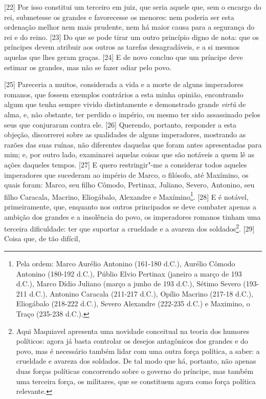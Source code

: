{[}22{]} Por isso constitui um
terceiro em juiz, que seria aquele que, sem o encargo do rei, submetesse
os grandes e favorecesse os menores: nem poderia ser esta ordenação
melhor nem mais prudente, nem há maior causa para a segurança do rei e
do reino. {[}23{]} Do que se pode tirar um outro princípio digno de
nota: que os príncipes devem atribuir aos outros as tarefas
desagradáveis, e a si mesmos aquelas que lhes geram graças. {[}24{]} E
de novo concluo que um príncipe deve estimar os grandes, mas não se
fazer odiar pelo povo.

{[}25{]} Pareceria a muitos, considerada a vida e a morte de alguns
imperadores romanos, que fossem exemplos contrários a esta minha
opinião, encontrando algum que tenha sempre vivido distintamente e
demonstrado grande \emph{virtù} de alma, e, não obstante, ter perdido o
império, ou mesmo ter sido assassinado pelos seus que conjuraram contra
ele. {[}26{]} Querendo, portanto, responder a esta objeção, discorrerei
sobre as qualidades de alguns imperadores, mostrando as razões das suas
ruínas, não diferentes daquelas que foram antes apresentadas para mim;
e, por outro lado, examinarei aquelas coisas que são notáveis a quem lê
as ações daqueles tempos. {[}27{]} E quero restringir"-me a considerar
todos aqueles imperadores que sucederam ao império de Marco, o filósofo,
até Maxímino, os quais foram: Marco, seu filho Cômodo, Pertinax,
Juliano, Severo, Antonino, seu filho Caracala, Macrino, Eliogábalo,
Alexandre e Maxímino\footnote{Pela ordem: Marco Aurélio Antonino
  (161-180 d.C.), Aurélio Cômodo Antonino (180-192 d.C.), Públio Elvio
  Pertinax (janeiro a março de 193 d.C.), Marco Dídio Juliano (março a
  junho de 193 d.C.), Sétimo Severo (193-211 d.C.), Antonino Caracala
  (211-217 d.C.), Opílio Macrino (217-18 d.C.), Eliogábalo (218-222
  d.C.), Severo Alexandre (222-235 d.C.) e Maximino, o Traço (235-238
  d.C.).}. {[}28{]} E é notável, primeiramente, que, enquanto nos outros
principados se deve combater apenas a ambição dos grandes e a insolência
do povo, os imperadores romanos tinham uma terceira dificuldade: ter que
suportar a crueldade e a avareza dos soldados\footnote{Aqui Maquiavel
  apresenta uma novidade conceitual na teoria dos humores políticos:
  agora já basta controlar os desejos antagônicos dos grandes e do povo,
  mas é necessário também lidar com uma outra força política, a saber: a
  crueldade e avareza dos soldados. De tal modo que há, portanto, não
  apenas duas forças políticas concorrendo sobre o governo do príncipe,
  mas também uma terceira força, os militares, que se constituem agora
  como força política relevante.}. {[}29{]} Coisa que, de tão difícil,
